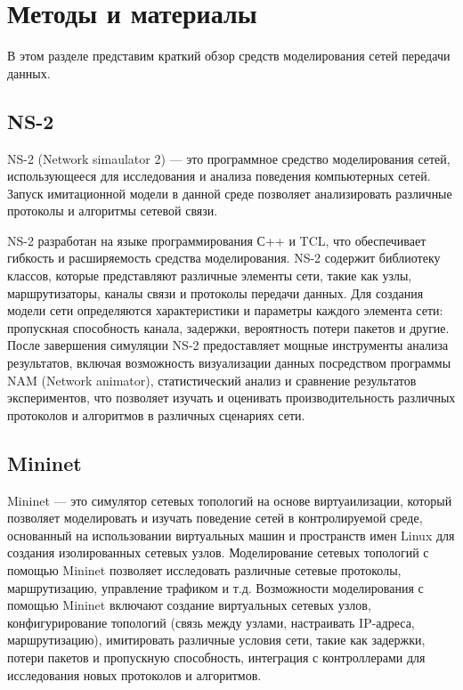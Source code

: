 \chapter{Методы и материалы}

В этом разделе представим краткий обзор средств моделирования сетей
передачи данных.

\section{NS-2}
NS-2 (Network simaulator 2) — это программное средство моделирования
сетей, использующееся для исследования и анализа поведения
компьютерных сетей.  Запуск имитационной модели в данной среде
позволяет анализировать различные протоколы и алгоритмы сетевой связи.

NS-2 разработан на языке программирования С++ и TCL, что обеспечивает
гибкость и расширяемость средства моделирования.  NS-2 содержит
библиотеку классов, которые представляют различные элементы сети,
такие как узлы, маршрутизаторы, каналы связи и протоколы передачи
данных. Для создания модели сети определяются характеристики и
параметры каждого элемента сети: пропускная способность канала,
задержки, вероятность потери пакетов и другие. После завершения
симуляции NS-2 предоставляет мощные инструменты анализа результатов,
включая возможность визуализации данных посредством программы NAM
(Network animator), статистический анализ и сравнение результатов
экспериментов, что позволяет изучать и оценивать производительность
различных протоколов и алгоритмов в различных сценариях
сети.

\section{Mininet}

Mininet — это симулятор сетевых топологий на основе виртуаилизации,
который позволяет моделировать и изучать поведение сетей в
контролируемой среде, основанный на использовании виртуальных машин и
пространств имен Linux для создания изолированных сетевых
узлов. Моделирование сетевых топологий с помощью Mininet позволяет
исследовать различные сетевые протоколы, маршрутизацию, управление
трафиком и т.д. Возможности моделирования с помощью Mininet включают
создание виртуальных сетевых узлов, конфигурирование топологий (связь
между узлами, настраивать IP-адреса, маршрутизацию), имитировать
различные условия сети, такие как задержки, потери пакетов и
пропускную способность, интеграция с контроллерами для исследования
новых протоколов и алгоритмов.
